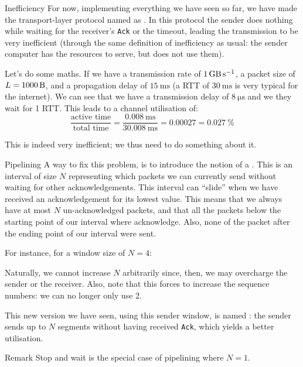 \documentclass[a4paper]{article}
\begin{document}
\begin{parag}{Inefficiency}
    For now, implementing everything we have seen so far, we have made the transport-layer protocol named as . In this protocol the sender does nothing while waiting for the receiver's \texttt{Ack} or the timeout, leading the transmission to be very inefficient (through the same definition of inefficiency as usual: the sender computer has the resources to serve, but does not use them).

    Let's do some maths. If we have a transmission rate of $\SI{1}{\giga\byte \per \second }$, a packet size of $L = \SI{1000}{\byte }$, and a propagation delay of $\SI{15}{\milli\second }$ (a RTT of $\SI{30}{\milli\second }$ is very typical for the internet). We can see that we have a transmission delay of $\SI{8}{\micro\second }$ and we they wait for 1 RTT. This leads to a channel utilisation of: 
    \[\frac{\text{active time}}{\text{total time}} = \frac{\SI{0.008}{\milli\second }}{\SI{30.008}{\milli\second }} = 0.00027 = \SI{0.027}{\percent}\]

    This is indeed very inefficient; we thus need to do something about it.

    \begin{subparag}{Pipelining}
        A way to fix this problem, is to introduce the notion of a . This is an interval of size $N$ representing which packets we can currently send without waiting for other acknowledgements. This interval can ``slide'' when we have received an acknowledgement for its lowest value. This means that we always have at most $N$ un-acknowledged packets, and that all the packets below the starting point of our interval where acknowledge. Also, none of the packet after the ending point of our interval were sent.

        For instance, for a window size of $N = 4$:

        Naturally, we cannot increase $N$ arbitrarily since, then, we may overcharge the sender or the receiver. Also, note that this forces to increase the sequence numbers: we can no longer only use 2.

        This new version we have seen, using this sender window, is named : the sender sends up to $N$ segments without having received \texttt{Ack}, which yields a better utilisation. 
    \end{subparag}

    \begin{subparag}{Remark}
        Stop and wait is the special case of pipelining where $N = 1$.
    \end{subparag}
\end{parag}
\end{document}
